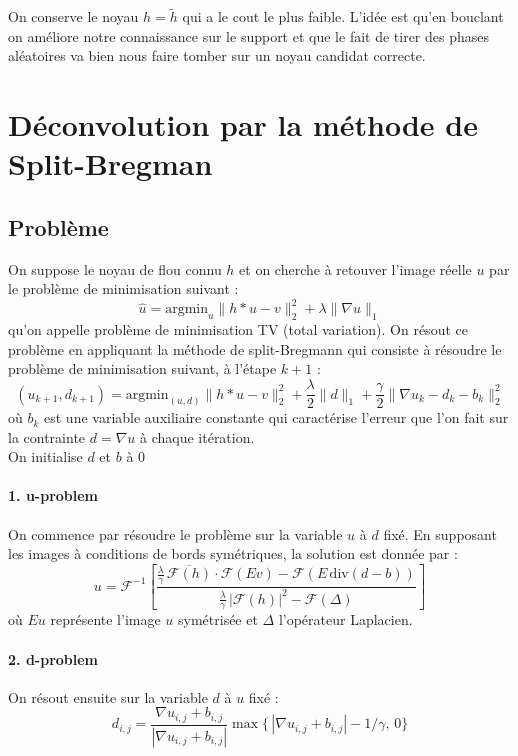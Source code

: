 \documentclass[a4paper,11pt]{article}
\begin{document}
On conserve le noyau $h=\tilde{h}$ qui a le cout le plus faible. L'idée est qu'en bouclant on améliore notre connaissance sur le support et que le fait de tirer des phases aléatoires va bien nous faire tomber sur un noyau candidat correcte.






\section {Déconvolution par la méthode de Split-Bregman}

\subsection{Problème}

On suppose le noyau de flou connu $h$ et on cherche à retouver l'image réelle $u$ par le problème de minimisation suivant : 
$$\hat{u} = \text{argmin}_u \|h*u-v \|_2^2 + \lambda\|\nabla u\|_1$$
qu'on appelle problème de minimisation TV (total variation). On résout ce problème en appliquant la méthode de split-Bregmann qui consiste à résoudre le problème de minimisation suivant, à l'étape $k+1$ : 
$$(u_{k+1},d_{k+1}) = \text{argmin}_{(u,d)}\|{h*u -v}\|_2^2 + \frac{\lambda}{2}\|d\|_1 + \frac{\gamma}{2} \|\nabla u_k - d_k - b_k\|_2^2  $$
où $b_k$ est une variable auxiliaire constante qui caractérise l'erreur que l'on fait sur la contrainte $d=\nabla u$ à chaque itération. \\
On initialise $d$ et $b$ à $0$

\paragraph*{1. u-problem}
On commence par résoudre le problème sur la variable $u$ à $d$ fixé. En supposant les images à conditions de bords symétriques, la solution est donnée par : 
$$
u = \mathcal{F}^{-1} \left[
\frac{
    \tfrac{\lambda}{\gamma} \, \overline{\mathcal{F}(h)} \cdot \mathcal{F}(Ev) 
    - \mathcal{F}(E \, \mathrm{div}(d-b))
}{
    \tfrac{\lambda}{\gamma} \, |\mathcal{F}(h)|^{2} - \mathcal{F}(\Delta)
}
\right]
$$
où $Eu$ représente l'image $u$ symétrisée et $\Delta$ l'opérateur Laplacien.


\paragraph*{2. d-problem}

On résout ensuite sur la variable $d$ à $u$ fixé :
$$d_{i,j} = \frac{\nabla u_{i,j} + b_{i,j}}{|\nabla u_{i,j} + b_{i,j}|}
\max\{\,|\nabla u_{i,j} + b_{i,j}| - 1/\gamma, \, 0\}$$
\end{document}
